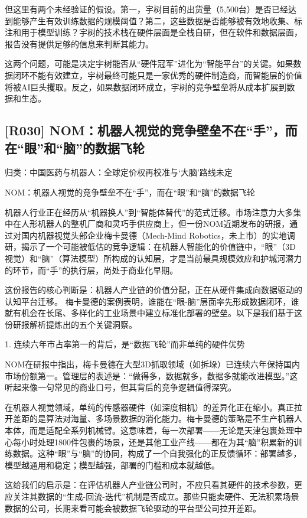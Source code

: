 \documentclass[11pt]{ctexart}
\begin{document}
但这里有两个未经验证的假设。第一，宇树目前的出货量（5,500台）是否已经达到能够产生有效训练数据的规模阈值？第二，这些数据是否能够被有效地收集、标注和用于模型训练？宇树的技术栈在硬件层面是全栈自研，但在软件和数据层面，报告没有提供足够的信息来判断其能力。

这两个问题，可能是决定宇树能否从“硬件冠军”进化为“智能平台”的关键。如果数据闭环不能有效建立，宇树最终可能只是一家优秀的硬件制造商，而智能层的价值将被AI巨头攫取。反之，如果数据闭环成立，宇树的竞争壁垒将从成本扩展到数据和生态。

\subsection{[R030] NOM：机器人视觉的竞争壁垒不在“手”，而在“眼”和“脑”的数据飞轮}
{\small\color{refgray}归类：中国医药与机器人：全球定价权再校准与‘大脑’路线未定}

NOM：机器人视觉的竞争壁垒不在“手”，而在“眼”和“脑”的数据飞轮

机器人行业正在经历从“机器换人”到“智能体替代”的范式迁移。市场注意力大多集中在人形机器人的整机厂商和灵巧手供应商上，但一份NOM近期发布的研报，通过对国内机器视觉头部企业梅卡曼德（Mech-Mind Robotics，未上市）的实地调研，揭示了一个可能被低估的竞争逻辑：在机器人智能化的价值链中，“眼”（3D视觉）和“脑”（算法模型）所构成的认知层，才是当前最具规模效应和护城河潜力的环节，而“手”的执行层，尚处于商业化早期。

这份报告的核心判断是：机器人产业链的价值分配，正在从硬件集成向数据驱动的认知平台迁移。 梅卡曼德的案例表明，谁能在“眼-脑”层面率先形成数据闭环，谁就有机会在长尾、多样化的工业场景中建立标准化部署的壁垒。以下是我们基于这份研报解析提炼出的五个关键洞察。

1. 连续六年市占率第一的背后，是“数据飞轮”而非单纯的硬件优势

NOM在研报中指出，梅卡曼德在大型3D抓取领域（如拆垛）已连续六年保持国内市场份额第一。管理层的表述是：“做得多，数据就多，数据多就能改进模型。”这听起来像一句常见的商业口号，但其背后的竞争逻辑值得深究。

在机器人视觉领域，单纯的传感器硬件（如深度相机）的差异化正在缩小。真正拉开差距的是算法对海量、多场景数据的消化能力。梅卡曼德的策略是不生产机器人本体，而是适配全系列机械臂。这意味着，每一次部署——无论是天津包裹处理中心每小时处理1800件包裹的场景，还是其他工业产线——都在为其“脑”积累新的训练数据。这种“眼”与“脑”的协同，构成了一个自我强化的正反馈循环：部署越多，模型越通用和稳定；模型越强，部署的门槛和成本就越低。

这给我们的启示是：在评估机器人产业链公司时，不应只看其硬件的技术参数，更应关注其数据的“生成-回流-迭代”机制是否成立。那些只能卖硬件、无法积累场景数据的公司，长期来看可能会被数据飞轮驱动的平台型公司拉开差距。
\end{document}
